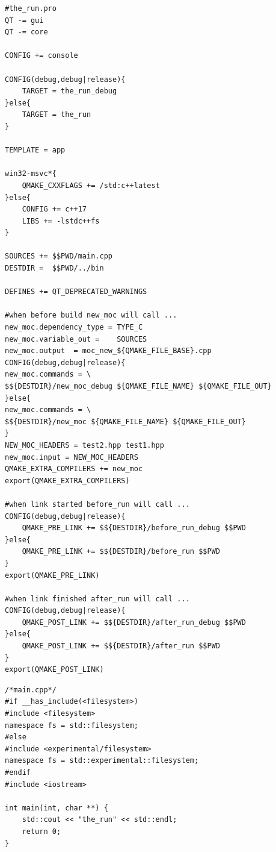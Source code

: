 \begin{lstlisting}[label=f000005,
caption=GoodLuck,
title=\lstlistingname\ \thelstlisting
]
#the_run.pro
QT -= gui
QT -= core

CONFIG += console

CONFIG(debug,debug|release){
    TARGET = the_run_debug
}else{
    TARGET = the_run
}

TEMPLATE = app

win32-msvc*{
    QMAKE_CXXFLAGS += /std:c++latest
}else{
    CONFIG += c++17
    LIBS += -lstdc++fs
}

SOURCES += $$PWD/main.cpp
DESTDIR =  $$PWD/../bin

DEFINES += QT_DEPRECATED_WARNINGS

#when before build new_moc will call ...
new_moc.dependency_type = TYPE_C
new_moc.variable_out =    SOURCES
new_moc.output  = moc_new_${QMAKE_FILE_BASE}.cpp
CONFIG(debug,debug|release){
new_moc.commands = \
$${DESTDIR}/new_moc_debug ${QMAKE_FILE_NAME} ${QMAKE_FILE_OUT}
}else{
new_moc.commands = \
$${DESTDIR}/new_moc ${QMAKE_FILE_NAME} ${QMAKE_FILE_OUT}
}
NEW_MOC_HEADERS = test2.hpp test1.hpp
new_moc.input = NEW_MOC_HEADERS
QMAKE_EXTRA_COMPILERS += new_moc
export(QMAKE_EXTRA_COMPILERS)

#when link started before_run will call ...
CONFIG(debug,debug|release){
    QMAKE_PRE_LINK += $${DESTDIR}/before_run_debug $$PWD
}else{
    QMAKE_PRE_LINK += $${DESTDIR}/before_run $$PWD
}
export(QMAKE_PRE_LINK)

#when link finished after_run will call ...
CONFIG(debug,debug|release){
    QMAKE_POST_LINK += $${DESTDIR}/after_run_debug $$PWD
}else{
    QMAKE_POST_LINK += $${DESTDIR}/after_run $$PWD
}
export(QMAKE_POST_LINK)
\end{lstlisting}          %
\begin{lstlisting}[label=f00000a,
caption=GoodLuck,
title=\lstlistingname\ \thelstlisting
]
/*main.cpp*/
#if __has_include(<filesystem>)
#include <filesystem>
namespace fs = std::filesystem;
#else
#include <experimental/filesystem>
namespace fs = std::experimental::filesystem;
#endif
#include <iostream>

int main(int, char **) {
    std::cout << "the_run" << std::endl;
    return 0;
}
\end{lstlisting}          %
